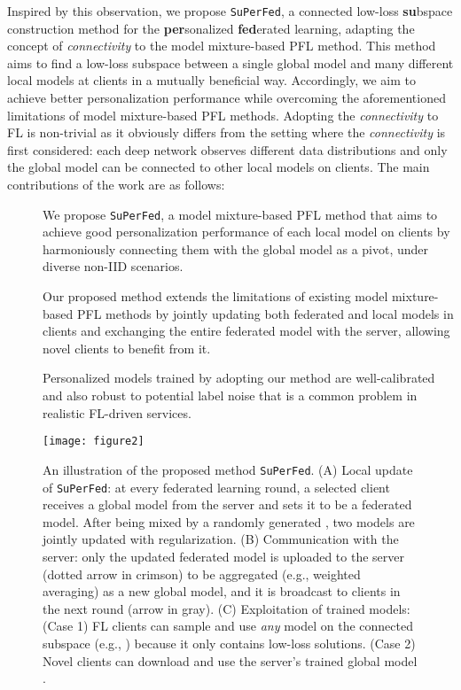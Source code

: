 \documentclass[sigconf]{acmart}
\begin{document}
\medskip
{}
Inspired by this observation, we propose \texttt{SuPerFed}, a connected low-loss \textbf{su}bspace construction method for the \textbf{per}sonalized \textbf{fed}erated learning, adapting the concept of \textit{connectivity} to the model mixture-based PFL method. This method aims to find a low-loss subspace between a single global model and many different local models at clients in a mutually beneficial way. Accordingly, we aim to achieve better personalization performance while overcoming the aforementioned limitations of model mixture-based PFL methods. Adopting the \textit{connectivity} to FL is non-trivial as it obviously differs from the setting where the \textit{connectivity} is first considered: each deep network observes different data distributions and only the global model can be connected to other local models on clients.
The main contributions of the work are as follows:
\begin{description}
\item[] We propose \texttt{SuPerFed}, a model mixture-based PFL method that aims to achieve good personalization performance of each local model on clients by harmoniously connecting them with the global model as a pivot, under diverse non-IID scenarios.
\item[] Our proposed method extends the limitations of existing model mixture-based PFL methods by jointly updating both federated and local models in clients and exchanging the entire federated model with the server, allowing novel clients to benefit from it.
\item[] Personalized models trained by adopting our method are well-calibrated and also robust to potential label noise that is a common problem in realistic FL-driven services.
\end{description}
\begin{figure*}[!htb]
\centering
\texttt{[image: figure2]}
\caption{An illustration of the proposed method \texttt{SuPerFed}. (A) Local update of \texttt{SuPerFed}: at every federated learning round, a selected client receives a global model from the server and sets it to be a federated model. After being mixed by a randomly generated , two models are jointly updated with regularization. (B) Communication with the server: only the updated federated model is uploaded to the server (dotted arrow in crimson) to be aggregated (e.g., weighted averaging) as a new global model, and it is broadcast to clients in the next round (arrow in gray). (C) Exploitation of trained models: (Case 1) FL clients can sample and use \textit{any} model on the connected subspace (e.g., ) because it only contains low-loss solutions. (Case 2) Novel clients can download and use the server's trained global model .}\label{fig2}
\end{figure*}
\end{document}
